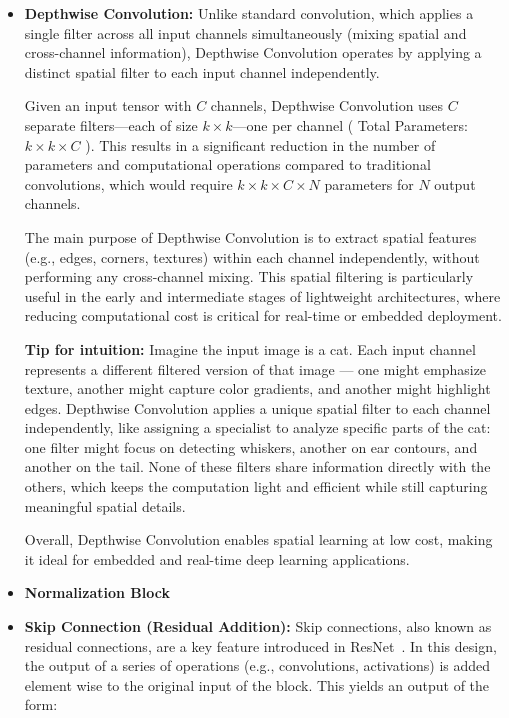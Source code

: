 \begin{itemize}
    \item \textbf{Depthwise Convolution:} 
    Unlike standard convolution, which applies a single filter across all input channels simultaneously (mixing spatial and cross-channel information), Depthwise Convolution operates by applying a distinct spatial filter to each input channel independently. 
    
    Given an input tensor with $C$ channels, Depthwise Convolution uses $C$ separate filters—each of size $k \times k$—one per channel ( Total Parameters: $k \times k \times C$ ). This results in a significant reduction in the number of parameters and computational operations compared to traditional convolutions, which would require $k \times k \times C \times N$ parameters for $N$ output channels.
    
    The main purpose of Depthwise Convolution is to extract spatial features (e.g., edges, corners, textures) within each channel independently, without performing any cross-channel mixing. This spatial filtering is particularly useful in the early and intermediate stages of lightweight architectures, where reducing computational cost is critical for real-time or embedded deployment.

    \textbf{Tip for intuition:} Imagine the input image is a cat. Each input channel represents a different filtered version of that image — one might emphasize texture, another might capture color gradients, and another might highlight edges. Depthwise Convolution applies a unique spatial filter to each channel independently, like assigning a specialist to analyze specific parts of the cat: one filter might focus on detecting whiskers, another on ear contours, and another on the tail. None of these filters share information directly with the others, which keeps the computation light and efficient while still capturing meaningful spatial details.

     Overall, Depthwise Convolution enables spatial learning at low cost, making it ideal for embedded and real-time deep learning applications.


    \item \textbf{Normalization Block}

    \item \textbf{Skip Connection (Residual Addition):} Skip connections, also known as residual connections, are a key feature introduced in ResNet~\cite{zhou2021resnext}. In this design, the output of a series of operations (e.g., convolutions, activations) is added element wise to the original input of the block. This yields an output of the form:


\end{itemize}
